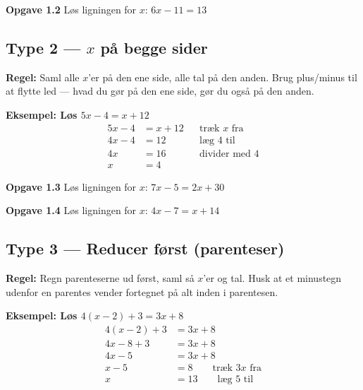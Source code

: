 \documentclass[11pt,a4paper]{article}
\begin{document}
\begin{opgavebox}
\textbf{Opgave 1.2} \quad Løs ligningen for $x$: \quad $6x - 11 = 13$
\end{opgavebox}

\subsection*{Type 2 --- $x$ på begge sider}

\begin{regelbox}
\textbf{Regel:} Saml alle $x$'er på den ene side, alle tal på den anden.
Brug plus/minus til at flytte led --- hvad du gør på den ene side, gør du
også på den anden.
\end{regelbox}

\textbf{Eksempel: Løs $5x - 4 = x + 12$}
\begin{align*}
  5x - 4 &= x + 12  &&\text{træk $x$ fra}\\
  4x - 4 &= 12      &&\text{læg $4$ til}\\
  4x     &= 16      &&\text{divider med $4$}\\
  x      &= 4
\end{align*}

\begin{opgavebox}
\textbf{Opgave 1.3} \quad Løs ligningen for $x$: \quad $7x - 5 = 2x + 30$
\end{opgavebox}

\begin{opgavebox}
\textbf{Opgave 1.4} \quad Løs ligningen for $x$: \quad $4x - 7 = x + 14$
\end{opgavebox}

\newpage
\subsection*{Type 3 --- Reducer først (parenteser)}

\begin{regelbox}
\textbf{Regel:} Regn parenteserne ud først, saml så $x$'er og tal. Husk at
et minustegn udenfor en parentes vender fortegnet på alt inden i parentesen.
\end{regelbox}

\textbf{Eksempel: Løs $4(x - 2) + 3 = 3x + 8$}
\begin{align*}
  4(x-2) + 3 &= 3x + 8\\
  4x - 8 + 3 &= 3x + 8\\
  4x - 5     &= 3x + 8\\
  x - 5      &= 8 \qquad\text{træk $3x$ fra}\\
  x          &= 13 \qquad\text{læg $5$ til}
\end{align*}
\end{document}
